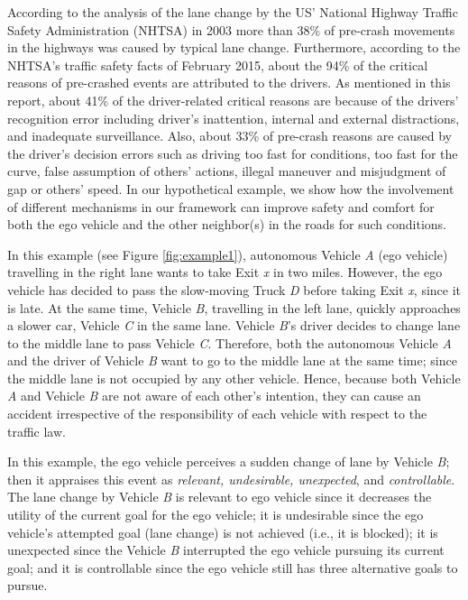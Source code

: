 \documentclass[journal, 11pt]{IEEEtran}
\begin{document}
According to the analysis of the lane change by the US' National Highway Traffic
Safety Administration (NHTSA) in 2003 more than 38\% of pre-crash movements in
the highways was caused by typical lane change. Furthermore, according to the
NHTSA's traffic safety facts of February 2015, about the 94\% of the critical
reasons of pre-crashed events are attributed to the drivers. As mentioned in
this report, about 41\% of the driver-related critical reasons are because of
the drivers' recognition error including driver’s inattention, internal and
external distractions, and inadequate surveillance. Also, about 33\% of
pre-crash reasons are caused by the driver's decision errors such as driving too
fast for conditions, too fast for the curve, false assumption of others’
actions, illegal maneuver and misjudgment of gap or others’ speed. In our
hypothetical example, we show how the involvement of different mechanisms in our
framework can improve safety and comfort for both the ego vehicle and the other
neighbor(s) in the roads for such conditions.

In this example (see Figure \ref{fig:example1}), autonomous Vehicle
\textit{A} (ego vehicle) travelling in the right lane wants to take Exit
\textit{x} in two miles. However, the ego vehicle has decided to pass the
slow-moving Truck \textit{D} before taking Exit \textit{x}, since it is late. At
the same time, Vehicle \textit{B}, travelling in the left lane, quickly
approaches a slower car, Vehicle \textit{C} in the same lane. Vehicle
\textit{B}'s driver decides to change lane to the middle lane to pass Vehicle
\textit{C}. Therefore, both the autonomous Vehicle \textit{A} and the driver of
Vehicle \textit{B} want to go to the middle lane at the same time; since the
middle lane is not occupied by any other vehicle. Hence, because both Vehicle
\textit{A} and Vehicle \textit{B} are not aware of each other's intention, they
can cause an accident irrespective of the responsibility of each vehicle with
respect to the traffic law.

In this example, the ego vehicle perceives a sudden change of lane by Vehicle
\textit{B}; then it appraises this event as \textit{relevant, undesirable,
unexpected}, and \textit{controllable}. The lane change by Vehicle \textit{B} is
relevant to ego vehicle since it decreases the utility of the current goal for
the ego vehicle; it is undesirable since the ego vehicle's attempted goal (lane
change) is not achieved (i.e., it is blocked); it is unexpected since the
Vehicle \textit{B} interrupted the ego vehicle pursuing its current goal; and it
is controllable since the ego vehicle still has three alternative goals to
pursue. 
\end{document}
